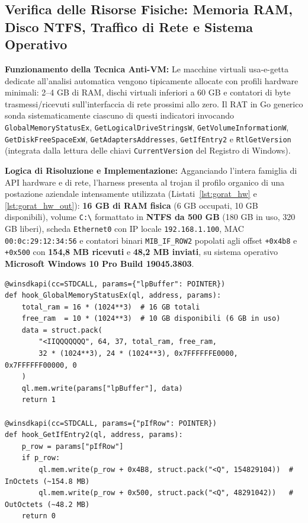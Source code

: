 \documentclass[11pt, a4paper]{article}
\begin{document}
\subsection{Verifica delle Risorse Fisiche: Memoria RAM, Disco NTFS, Traffico di Rete e Sistema Operativo}

\textbf{Funzionamento della Tecnica Anti-VM:} Le macchine virtuali usa-e-getta dedicate all'analisi automatica vengono tipicamente allocate con profili hardware minimali: 2--4 GB di RAM, dischi virtuali inferiori a 60 GB e contatori di byte trasmessi/ricevuti sull'interfaccia di rete prossimi allo zero. Il RAT in Go generico sonda sistematicamente ciascuno di questi indicatori invocando \texttt{Global\allowbreak{}Memory\allowbreak{}Status\allowbreak{}Ex}, \texttt{Get\allowbreak{}Logical\allowbreak{}Drive\allowbreak{}StringsW}, \texttt{Get\allowbreak{}Volume\allowbreak{}InformationW}, \texttt{Get\allowbreak{}Disk\allowbreak{}Free\allowbreak{}Space\allowbreak{}ExW}, \texttt{Get\allowbreak{}Adapters\allowbreak{}Addresses}, \texttt{GetIfEntry2} e \texttt{Rtl\allowbreak{}Get\allowbreak{}Version} (integrata dalla lettura delle chiavi \texttt{Current\allowbreak{}Version} del Registro di Windows).

\textbf{Logica di Risoluzione e Implementazione:} Agganciando l'intera famiglia di API hardware e di rete, l'harness presenta al trojan il profilo organico di una postazione aziendale intensamente utilizzata (Listati~\ref{lst:gorat_hw} e \ref{lst:gorat_hw_out}): \textbf{16 GB di RAM fisica} (6 GB occupati, 10 GB disponibili), volume \texttt{C:\textbackslash\allowbreak{}} formattato in \textbf{NTFS da 500 GB} (180 GB in uso, 320 GB liberi), scheda \texttt{Ethernet0} con IP locale \texttt{192.168.1.100}, MAC \texttt{00:0c:29:12:34:56} e contatori binari \texttt{MIB\_\allowbreak{}IF\_\allowbreak{}ROW2} popolati agli offset \texttt{+0x4b8} e \texttt{+0x500} con \textbf{154,8 MB ricevuti} e \textbf{48,2 MB inviati}, su sistema operativo \textbf{Microsoft Windows 10 Pro Build 19045.3803}.

\begin{lstlisting}[style=pythoncode, caption={Simulazione di 16 GB di RAM e traffico storico di rete nella struttura MIB\_IF\_ROW2.}, label={lst:gorat_hw}]
@winsdkapi(cc=STDCALL, params={"lpBuffer": POINTER})
def hook_GlobalMemoryStatusEx(ql, address, params):
    total_ram = 16 * (1024**3)  # 16 GB totali
    free_ram  = 10 * (1024**3)  # 10 GB disponibili (6 GB in uso)
    data = struct.pack(
        "<IIQQQQQQQ", 64, 37, total_ram, free_ram,
        32 * (1024**3), 24 * (1024**3), 0x7FFFFFFE0000, 0x7FFFFFF00000, 0
    )
    ql.mem.write(params["lpBuffer"], data)
    return 1

@winsdkapi(cc=STDCALL, params={"pIfRow": POINTER})
def hook_GetIfEntry2(ql, address, params):
    p_row = params["pIfRow"]
    if p_row:
        ql.mem.write(p_row + 0x4B8, struct.pack("<Q", 154829104))  # InOctets (~154.8 MB)
        ql.mem.write(p_row + 0x500, struct.pack("<Q", 48291042))   # OutOctets (~48.2 MB)
    return 0
\end{lstlisting}
\end{document}
